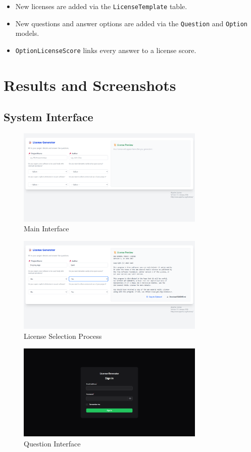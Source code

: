 \documentclass[12pt,a4paper]{report}
\begin{document}
\begin{itemize}
    \item New licenses are added via the \texttt{LicenseTemplate} table.
    \item New questions and answer options are added via the \texttt{Question} and \texttt{Option} models.
    \item \texttt{OptionLicenseScore} links every answer to a license score.
\end{itemize}

\chapter{Results and Screenshots}
\section{System Interface}
\begin{figure}[H]
    \centering
    \includegraphics[width=0.8\textwidth]{Screenshots/os1.png}
    \caption{Main Interface}
\end{figure}

\begin{figure}[H]
    \centering
    \includegraphics[width=0.8\textwidth]{Screenshots/os2.png}
    \caption{License Selection Process}
\end{figure}

\begin{figure}[H]
    \centering
    \includegraphics[width=0.8\textwidth]{Screenshots/os3.png}
    \caption{Question Interface}
\end{figure}
\end{document}
